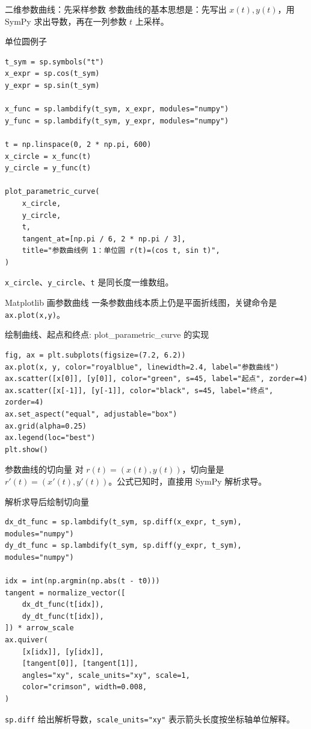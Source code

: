 \documentclass[aspectratio=169,11pt]{ctexbeamer}
\begin{document}
\begin{frame}[fragile]{二维参数曲线：先采样参数}
  参数曲线的基本思想是：先写出 \(x(t),y(t)\)，用 SymPy 求出导数，再在一列参数 \(t\) 上采样。

  \begin{block}{单位圆例子}
\begin{Verbatim}[fontsize=\tiny]
t_sym = sp.symbols("t")
x_expr = sp.cos(t_sym)
y_expr = sp.sin(t_sym)

x_func = sp.lambdify(t_sym, x_expr, modules="numpy")
y_func = sp.lambdify(t_sym, y_expr, modules="numpy")

t = np.linspace(0, 2 * np.pi, 600)
x_circle = x_func(t)
y_circle = y_func(t)

plot_parametric_curve(
    x_circle,
    y_circle,
    t,
    tangent_at=[np.pi / 6, 2 * np.pi / 3],
    title="参数曲线例 1：单位圆 r(t)=(cos t, sin t)",
)
\end{Verbatim}
  \end{block}

  \texttt{x\_circle}、\texttt{y\_circle}、\texttt{t} 是同长度一维数组。
\end{frame}

\begin{frame}[fragile]{Matplotlib 画参数曲线}
  一条参数曲线本质上仍是平面折线图，关键命令是 \texttt{ax.plot(x,y)}。

  \begin{block}{绘制曲线、起点和终点: plot\_parametric\_curve 的实现}
\begin{Verbatim}[fontsize=\tiny]
fig, ax = plt.subplots(figsize=(7.2, 6.2))
ax.plot(x, y, color="royalblue", linewidth=2.4, label="参数曲线")
ax.scatter([x[0]], [y[0]], color="green", s=45, label="起点", zorder=4)
ax.scatter([x[-1]], [y[-1]], color="black", s=45, label="终点", zorder=4)
ax.set_aspect("equal", adjustable="box")
ax.grid(alpha=0.25)
ax.legend(loc="best")
plt.show()
\end{Verbatim}
  \end{block}
\end{frame}

\begin{frame}[fragile]{参数曲线的切向量}
  对 \(r(t)=(x(t),y(t))\)，切向量是 \(r'(t)=(x'(t),y'(t))\)。公式已知时，直接用 SymPy 解析求导。

  \begin{block}{解析求导后绘制切向量}
\begin{Verbatim}[fontsize=\tiny]
dx_dt_func = sp.lambdify(t_sym, sp.diff(x_expr, t_sym), modules="numpy")
dy_dt_func = sp.lambdify(t_sym, sp.diff(y_expr, t_sym), modules="numpy")

idx = int(np.argmin(np.abs(t - t0)))
tangent = normalize_vector([
    dx_dt_func(t[idx]),
    dy_dt_func(t[idx]),
]) * arrow_scale
ax.quiver(
    [x[idx]], [y[idx]],
    [tangent[0]], [tangent[1]],
    angles="xy", scale_units="xy", scale=1,
    color="crimson", width=0.008,
)
\end{Verbatim}
  \end{block}

  \texttt{sp.diff} 给出解析导数，\texttt{scale\_units="xy"} 表示箭头长度按坐标轴单位解释。
\end{frame}
\end{document}
